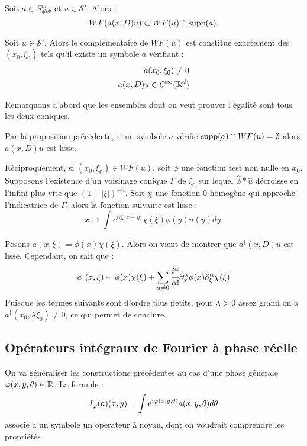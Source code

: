 \begin{prop}
	Soit $a \in S^m_{glob}$ et $u \in \mathcal{S}'$. Alors :
	\begin{equation*}
		WF(a(x,D)u) \subset WF(u) \cap \operatorname{supp}(a).
	\end{equation*}
\end{prop}
\begin{corr}
  Soit $u \in \mathcal{S}'$. Alors le complémentaire de $WF(u)$ est constitué exactement des $(x_0,\xi_0)$ tels qu'il existe un symbole $a$ vérifiant :
  \begin{align*}
    a(x_0,\xi_0)\neq 0\\
    a(x,D)u \in C^{\infty}(\mathbb{R}^d)
  \end{align*}
\end{corr}
\begin{preuve}
Remarquons d'abord que les ensembles dont on veut prouver l'égalité sont tous les deux coniques.

Par la proposition précédente, si un symbole $a$ vérifie $\operatorname{supp}(a)\cap WF(u)=\emptyset$ alors $a(x,D)u$ est lisse.

Réciproquement, si $(x_0,\xi_0)\in WF(u)$, soit $\phi$ une fonction test non nulle en $x_0$. Supposons l'existence d'un voisinage conique $\Gamma$ de $\xi_0$ sur lequel $\hat{\phi}*\hat{u}$ décroisse en l'infini plus vite que $(1+|\xi|)^{-n}$. Soit $\chi$ une fonction 0-homogène qui approche l'indicatrice de $\Gamma$, alors la fonction suivante est lisse :
\begin{equation*}
  x \mapsto \int e^{i\langle \xi,x-y\rangle}\chi(\xi)\phi(y)u(y)dy.
\end{equation*}

Posons $a(x,\xi)=\phi(x)\chi(\xi)$. Alors on vient de montrer que $a^{\dagger}(x,D)u$ est lisse. Cependant, on sait que :
\begin{equation*}
  a^{\dagger}(x,\xi) \sim \phi(x)\chi(\xi) + \sum_{\alpha \neq 0}\cfrac{i^{\alpha}}{\alpha !} \partial_x^{\alpha}\phi(x)\partial_{\xi}^{\alpha}\chi(\xi)
\end{equation*}
Puisque les termes suivants sont d'ordre plus petits, pour $\lambda>0 $ assez grand on a $a^{\dagger}(x_0,\lambda \xi_0) \neq 0$, ce qui permet de conclure.
\end{preuve}

\subsection{Opérateurs intégraux de Fourier à phase réelle}
On va généraliser les constructions précédentes au cas d'une phase générale $\varphi(x,y,\theta) \in \mathbb{R}$. La formule :
\begin{equation}
  I_{\varphi}(a)(x,y) = \int e^{i\varphi(x,y,\theta)}a(x,y,\theta)d\theta
\end{equation}
associe à un symbole un opérateur à noyau, dont on voudrait comprendre les propriétés.

